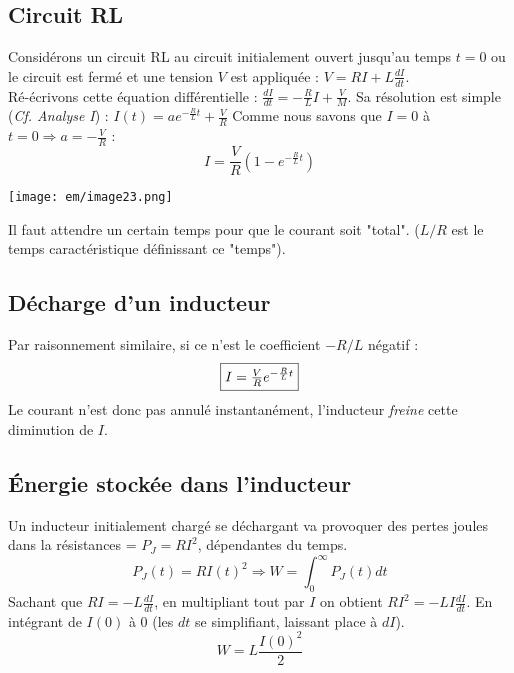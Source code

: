 \documentclass[british,french,11pt, a4paper, openany]{book}
\begin{document}
\subsection{Circuit RL}
Considérons un circuit RL au circuit initialement ouvert jusqu'au temps $t = 0$ ou le circuit est fermé et une tension $V$ est appliquée : $V = RI + L\frac{dI}{dt}$.\\
Ré-écrivons cette équation différentielle : $\frac{dI}{dt} = -\frac{R}{L}I + \frac{V}{M}$. Sa résolution est simple (\textit{Cf. Analyse I}) :
$I(t) = ae^{-\frac{R}{L}t} + \frac{V}{R}$
Comme nous savons que $I = 0$ à $t = 0 \Rightarrow a= - \frac{V}{R}$ :
\begin{equation}
	I = \frac{V}{R}\left(1-e^{-\frac{R}{L}t}\right)
\end{equation}

\begin{center}
	\texttt{[image: em/image23.png]}\\
\end{center}
Il faut attendre un certain temps pour que le courant soit "total". ($L/R$ est le temps caractéristique  définissant ce "temps").

\subsection{Décharge d'un inducteur}
Par raisonnement similaire, si ce n'est le coefficient $-R/L$ négatif : 
\begin{equation}
	\fbox{$ I = \frac{V}{R}e^{-\frac{R}{L}t}$}
\end{equation}
Le courant n'est donc pas annulé instantanément, l'inducteur \textit{freine} cette diminution de $I$.

\subsection{Énergie stockée dans l'inducteur}
Un inducteur initialement chargé se déchargant va provoquer des pertes joules dans la résistances = $P_J = RI^2$, dépendantes du temps.
\begin{equation}
	P_J(t) = RI(t)^2 \Rightarrow W = \int_0^\infty P_J(t) dt
\end{equation}
Sachant que $RI = -L\frac{dI}{dt}$, en multipliant tout par $I$ on obtient $RI^2 = -LI\frac{dI}{dt}$. En intégrant de $I(0)$ à $0$ (les $dt$ se simplifiant, laissant place à $dI$).
\begin{equation}
	W = L\frac{I(0)^2}{2}
\end{equation}
\end{document}
